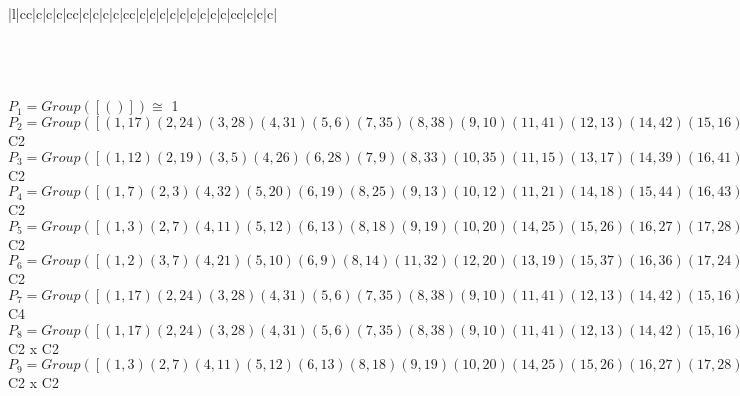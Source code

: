 \documentclass[varwidth=\maxdimen,border=10]{standalone}
\begin{document}
\begin{tabular}
\begin{array}{|l|cc|c|c|c|cc|c|c|c|c|cc|c|c|c|c|c|c|c|c|c|cc|c|c|c|}
\end{array}\)\\
\ \\
\ \\
$P_{1} = Group( [ () ] )\cong$ 1\ \\
$P_{2} = Group( [ ( 1,17)( 2,24)( 3,28)( 4,31)( 5, 6)( 7,35)( 8,38)( 9,10)(11,41)(12,13)(14,42)(15,16)(18,45)(19,20)(21,46)(22,23)(25,47)(26,27)(29,30)(32,48)(33,34)(36,37)(39,40)(43,44) ] )\cong$ C2\ \\
$P_{3} = Group( [ ( 1,12)( 2,19)( 3, 5)( 4,26)( 6,28)( 7, 9)( 8,33)(10,35)(11,15)(13,17)(14,39)(16,41)(18,22)(20,24)(21,43)(23,45)(25,29)(27,31)(30,47)(32,36)(34,38)(37,48)(40,42)(44,46) ] )\cong$ C2\ \\
$P_{4} = Group( [ ( 1, 7)( 2, 3)( 4,32)( 5,20)( 6,19)( 8,25)( 9,13)(10,12)(11,21)(14,18)(15,44)(16,43)(17,35)(22,40)(23,39)(24,28)(26,37)(27,36)(29,34)(30,33)(31,48)(38,47)(41,46)(42,45) ] )\cong$ C2\ \\
$P_{5} = Group( [ ( 1, 3)( 2, 7)( 4,11)( 5,12)( 6,13)( 8,18)( 9,19)(10,20)(14,25)(15,26)(16,27)(17,28)(21,32)(22,33)(23,34)(24,35)(29,39)(30,40)(31,41)(36,43)(37,44)(38,45)(42,47)(46,48) ] )\cong$ C2\ \\
$P_{6} = Group( [ ( 1, 2)( 3, 7)( 4,21)( 5,10)( 6, 9)( 8,14)(11,32)(12,20)(13,19)(15,37)(16,36)(17,24)(18,25)(22,30)(23,29)(26,44)(27,43)(28,35)(31,46)(33,40)(34,39)(38,42)(41,48)(45,47) ] )\cong$ C2\ \\
$P_{7} = Group( [ ( 1,17)( 2,24)( 3,28)( 4,31)( 5, 6)( 7,35)( 8,38)( 9,10)(11,41)(12,13)(14,42)(15,16)(18,45)(19,20)(21,46)(22,23)(25,47)(26,27)(29,30)(32,48)(33,34)(36,37)(39,40)(43,44), ( 1, 9,17,10)( 2, 5,24, 6)( 3,19,28,20)( 4,36,31,37)( 7,12,35,13)( 8,29,38,30)(11,43,41,44)(14,22,42,23)(15,46,16,21)(18,39,45,40)(25,33,47,34)(26,48,27,32) ] )\cong$ C4\ \\
$P_{8} = Group( [ ( 1,17)( 2,24)( 3,28)( 4,31)( 5, 6)( 7,35)( 8,38)( 9,10)(11,41)(12,13)(14,42)(15,16)(18,45)(19,20)(21,46)(22,23)(25,47)(26,27)(29,30)(32,48)(33,34)(36,37)(39,40)(43,44), ( 1,12)( 2,19)( 3, 5)( 4,26)( 6,28)( 7, 9)( 8,33)(10,35)(11,15)(13,17)(14,39)(16,41)(18,22)(20,24)(21,43)(23,45)(25,29)(27,31)(30,47)(32,36)(34,38)(37,48)(40,42)(44,46) ] )\cong$ C2 x C2\ \\
$P_{9} = Group( [ ( 1, 3)( 2, 7)( 4,11)( 5,12)( 6,13)( 8,18)( 9,19)(10,20)(14,25)(15,26)(16,27)(17,28)(21,32)(22,33)(23,34)(24,35)(29,39)(30,40)(31,41)(36,43)(37,44)(38,45)(42,47)(46,48), ( 1, 5)( 2, 9)( 3,12)( 4,15)( 6,17)( 7,19)( 8,22)(10,24)(11,26)(13,28)(14,29)(16,31)(18,33)(20,35)(21,36)(23,38)(25,39)(27,41)(30,42)(32,43)(34,45)(37,46)(40,47)(44,48) ] )\cong$ C2 x C2\ \\

\end{tabular}
\end{document}

